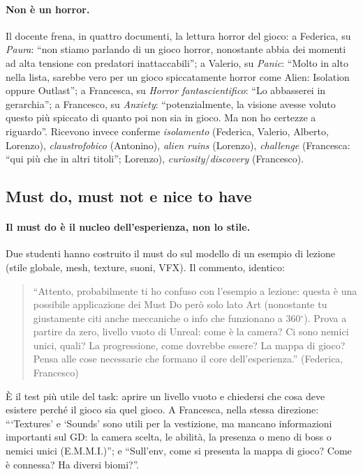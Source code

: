 \paragraph{Non è un horror.} Il docente frena, in quattro documenti, la
lettura horror del gioco: a Federica, su \emph{Paura}: ``non stiamo parlando
di un gioco horror, nonostante abbia dei momenti ad alta tensione con
predatori inattaccabili''; a Valerio, su \emph{Panic}: ``Molto in alto nella
lista, sarebbe vero per un gioco spiccatamente horror come Alien: Isolation
oppure Outlast''; a Francesca, su \emph{Horror fantascientifico}: ``Lo
abbasserei in gerarchia''; a Francesco, su \emph{Anxiety}: ``potenzialmente,
la visione avesse voluto questo più spiccato di quanto poi non sia in gioco.
Ma non ho certezze a riguardo''. Ricevono invece conferme \emph{isolamento}
(Federica, Valerio, Alberto, Lorenzo), \emph{claustrofobico} (Antonino),
\emph{alien ruins} (Lorenzo), \emph{challenge} (Francesca: ``qui più che in
altri titoli''; Lorenzo), \emph{curiosity}/\emph{discovery} (Francesco).

\subsection{Must do, must not e nice to have}
\label{rv:t5:sec:design}

\paragraph{Il must do è il nucleo dell'esperienza, non lo stile.} Due
studenti hanno costruito il must do sul modello di un esempio di lezione
(stile globale, mesh, texture, suoni, VFX). Il commento, identico:
\begin{quote}
  ``Attento, probabilmente ti ho confuso con l'esempio a lezione: questa è
  una possibile applicazione dei Must Do però solo lato Art (nonostante tu
  giustamente citi anche meccaniche o info che funzionano a 360$^\circ$).
  Prova a partire da zero, livello vuoto di Unreal: come è la camera? Ci sono
  nemici unici, quali? La progressione, come dovrebbe essere? La mappa di
  gioco? Pensa alle cose necessarie che formano il core dell'esperienza.''
  (Federica, Francesco)
\end{quote}
È il test più utile del task: aprire un livello vuoto e chiedersi che cosa
deve esistere perché il gioco sia quel gioco. A Francesca, nella stessa
direzione: ```Textures' e `Sounds' sono utili per la vestizione, ma mancano
informazioni importanti sul GD: la camera scelta, le abilità, la presenza o
meno di boss o nemici unici (E.M.M.I.)''; e ``Sull'env, come si presenta la
mappa di gioco? Come è connessa? Ha diversi biomi?''.

